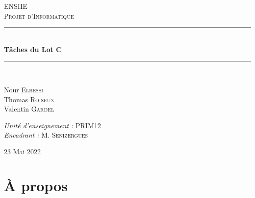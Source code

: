 \documentclass[12pt, openany]{report}
\newcommand{\HRule}{\rule{\linewidth}{0.5mm}}
\begin{document}
	\begin{titlepage}
			\begin{center}
				
				\textsc{ \LARGE ENSIIE} \\[2cm]
				
				\textsc{ \LARGE Projet d'Informatique} \\[1.5cm]
				
				\HRule \\[0.4cm]
				{ \huge \bfseries Tâches du Lot C\\[0.4cm] }
				
				\HRule \\[2cm]
				
				\begin{minipage}{0.4\textwidth}
					\begin{flushleft} \large
						Nour \textsc{Elbessi}\\
						Thomas \textsc{Roiseux}\\
						Valentin \textsc{Gardel}\\
					\end{flushleft}
				\end{minipage}
				\begin{minipage}{0.5\textwidth}
					\begin{flushright} \large
						\emph{Unité d'enseignement :} PRIM12 \\
						\emph{Encadrant :} M. \textsc{Senizergues}\\
					\end{flushright}
				\end{minipage}
			
				
				\vfill
				
				{\large 23 Mai 2022}
				
				
			\end{center}
	\end{titlepage}

	\renewcommand*\contentsname{Sommaire}
	\tableofcontents
	
   \chapter{À propos}
   	
\end{document}
